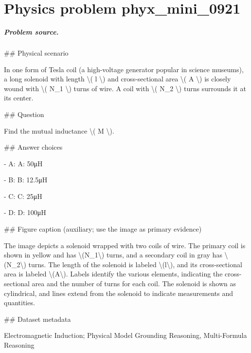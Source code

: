 
\chapter{Physics problem phyx\_mini\_0921}
\label{ch:PhyXMiniProblems_problem_phyx_mini_0921}

\paragraph{Problem source.}
\#\# Physical scenario

In one form of Tesla coil (a high-voltage generator popular in science museums), a long solenoid with length \textbackslash{}( l \textbackslash{}) and cross-sectional area \textbackslash{}( A \textbackslash{}) is closely wound with \textbackslash{}( N\_1 \textbackslash{}) turns of wire. A coil with \textbackslash{}( N\_2 \textbackslash{}) turns surrounds it at its center.

\#\# Question

Find the mutual inductance \textbackslash{}( M \textbackslash{}).

\#\# Answer choices

- A: A: 50μH

- B: B: 12.5μH

- C: C: 25μH

- D: D: 100μH

\#\# Figure caption (auxiliary; use the image as primary evidence)

The image depicts a solenoid wrapped with two coils of wire. The primary coil is shown in yellow and has \textbackslash{}(N\_1\textbackslash{}) turns, and a secondary coil in gray has \textbackslash{}(N\_2\textbackslash{}) turns. The length of the solenoid is labeled \textbackslash{}(l\textbackslash{}), and its cross-sectional area is labeled \textbackslash{}(A\textbackslash{}). Labels identify the various elements, indicating the cross-sectional area and the number of turns for each coil. The solenoid is shown as cylindrical, and lines extend from the solenoid to indicate measurements and quantities.

\#\# Dataset metadata

Electromagnetic Induction; Physical Model Grounding Reasoning, Multi-Formula Reasoning

